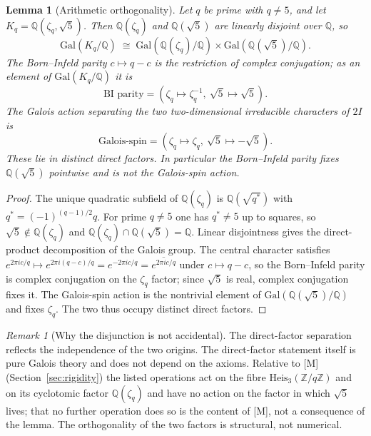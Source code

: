 \documentclass[11pt]{article}
\newtheorem{lemma}{Lemma}
\theoremstyle{definition}
\theoremstyle{remark}
\newtheorem{remark}{Remark}
\newcommand{\Heis}{\mathrm{Heis}_3(\mathbb{Z}/q\mathbb{Z})}
\newcommand{\Gal}{\mathrm{Gal}}
\begin{document}
    \begin{lemma}[Arithmetic orthogonality]
      \label{lem:organizing}
      Let $q$ be prime with $q\neq 5$, and let $K_q=\mathbb{Q}(\zeta_q,\sqrt{5})$.
      Then $\mathbb{Q}(\zeta_q)$ and $\mathbb{Q}(\sqrt{5})$ are linearly disjoint over $\mathbb{Q}$, so
      \[
        \Gal(K_q/\mathbb{Q})\;\cong\;\Gal(\mathbb{Q}(\zeta_q)/\mathbb{Q})\times\Gal(\mathbb{Q}(\sqrt{5})/\mathbb{Q}).
      \]
      The Born--Infeld parity $c\mapsto q-c$ is the restriction of complex conjugation; as an element of
      $\Gal(K_q/\mathbb{Q})$ it is
      \[
        \text{BI parity}=(\zeta_q\mapsto\zeta_q^{-1},\ \sqrt{5}\mapsto\sqrt{5}).
      \]
      The Galois action separating the two two-dimensional irreducible characters of $2I$ is
      \[
        \text{Galois-spin}=(\zeta_q\mapsto\zeta_q,\ \sqrt{5}\mapsto-\sqrt{5}).
      \]
      These lie in distinct direct factors.
      In particular the Born--Infeld parity fixes $\mathbb{Q}(\sqrt{5})$ pointwise and is not the Galois-spin action.
    \end{lemma}

    \begin{proof}
      The unique quadratic subfield of $\mathbb{Q}(\zeta_q)$ is $\mathbb{Q}(\sqrt{q^{*}})$ with
      $q^{*}=(-1)^{(q-1)/2}q$.
      For prime $q\neq 5$ one has $q^{*}\neq 5$ up to squares, so $\sqrt{5}\notin\mathbb{Q}(\zeta_q)$ and
      $\mathbb{Q}(\zeta_q)\cap\mathbb{Q}(\sqrt{5})=\mathbb{Q}$.
      Linear disjointness gives the direct-product decomposition of the Galois group.
      The central character satisfies
      $e^{2\pi i c/q}\mapsto e^{2\pi i(q-c)/q}=e^{-2\pi i c/q}=\overline{e^{2\pi i c/q}}$ under $c\mapsto q-c$, so the
      Born--Infeld parity is complex conjugation on the $\zeta_q$ factor; since $\sqrt{5}$ is real, complex conjugation
      fixes it.
      The Galois-spin action is the nontrivial element of $\Gal(\mathbb{Q}(\sqrt{5})/\mathbb{Q})$ and fixes $\zeta_q$.
      The two thus occupy distinct direct factors.
    \end{proof}

    \begin{remark}[Why the disjunction is not accidental]
The direct-factor separation reflects the independence of the two origins.
The direct-factor statement itself is pure Galois theory and does not depend on the axioms.
Relative to [M] (Section~\ref{sec:rigidity}) the listed operations act on the fibre $\Heis$ and on its cyclotomic
factor $\mathbb{Q}(\zeta_q)$ and have no action on the factor in which $\sqrt{5}$ lives; that no further
operation does so is the content of [M], not a consequence of the lemma.
The orthogonality of the two factors is structural, not numerical.
    \end{remark}
\end{document}
